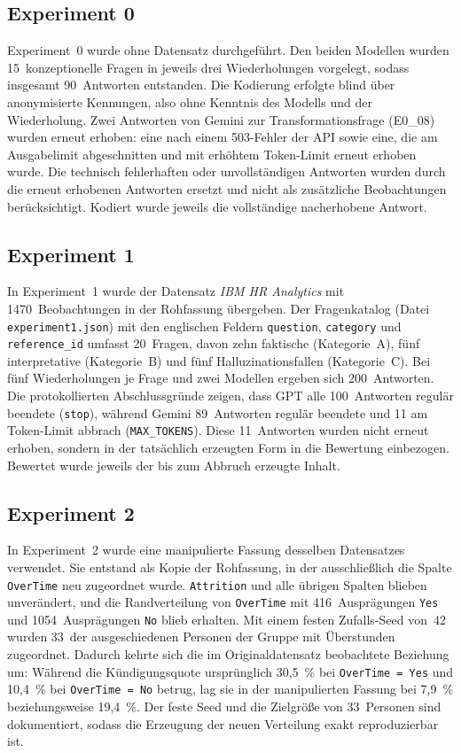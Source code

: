 \subsection{Experiment 0}
\label{exec:experiment0}

Experiment~0 wurde ohne Datensatz durchgeführt. Den beiden Modellen wurden 15~konzeptionelle Fragen in jeweils drei Wiederholungen vorgelegt, sodass insgesamt 90~Antworten entstanden. Die Kodierung erfolgte blind über anonymisierte Kennungen, also ohne Kenntnis des Modells und der Wiederholung. Zwei Antworten von Gemini zur Transformationsfrage (E0\_08) wurden erneut erhoben: eine nach einem 503-Fehler der API sowie eine, die am Ausgabelimit abgeschnitten und mit erhöhtem Token-Limit erneut erhoben wurde. Die technisch fehlerhaften oder unvollständigen Antworten wurden durch die erneut erhobenen Antworten ersetzt und nicht als zusätzliche Beobachtungen berücksichtigt. Kodiert wurde jeweils die vollständige nacherhobene Antwort.

\subsection{Experiment 1}
\label{exec:experiment1}

In Experiment~1 wurde der Datensatz \textit{IBM HR Analytics} mit 1470~Beobachtungen in der Rohfassung übergeben. Der Fragenkatalog (Datei \texttt{experiment1.json}) mit den englischen Feldern \texttt{question}, \texttt{category} und \texttt{reference\_id} umfasst 20~Fragen, davon zehn faktische (Kategorie~A), fünf interpretative (Kategorie~B) und fünf Halluzinationsfallen (Kategorie~C). Bei fünf Wiederholungen je Frage und zwei Modellen ergeben sich 200~Antworten. Die protokollierten Abschlussgründe zeigen, dass GPT alle 100~Antworten regulär beendete (\texttt{stop}), während Gemini 89~Antworten regulär beendete und 11 am Token-Limit abbrach (\texttt{MAX\_TOKENS}). Diese 11~Antworten wurden nicht erneut erhoben, sondern in der tatsächlich erzeugten Form in die Bewertung einbezogen. Bewertet wurde jeweils der bis zum Abbruch erzeugte Inhalt.

\subsection{Experiment 2}
\label{exec:experiment2}

In Experiment~2 wurde eine manipulierte Fassung desselben Datensatzes verwendet. Sie entstand als Kopie der Rohfassung, in der ausschließlich die Spalte \texttt{OverTime} neu zugeordnet wurde. \texttt{Attrition} und alle übrigen Spalten blieben unverändert, und die Randverteilung von \texttt{OverTime} mit 416~Ausprägungen \texttt{Yes} und 1054~Ausprägungen \texttt{No} blieb erhalten. Mit einem festen Zufalls-Seed von~42 wurden 33~der ausgeschiedenen Personen der Gruppe mit Überstunden zugeordnet. Dadurch kehrte sich die im Originaldatensatz beobachtete Beziehung um: Während die Kündigungsquote ursprünglich 30,5~\% bei \texttt{OverTime = Yes} und 10,4~\% bei \texttt{OverTime = No} betrug, lag sie in der manipulierten Fassung bei 7,9~\% beziehungsweise 19,4~\%. Der feste Seed und die Zielgröße von 33~Personen sind dokumentiert, sodass die Erzeugung der neuen Verteilung exakt reproduzierbar ist.

